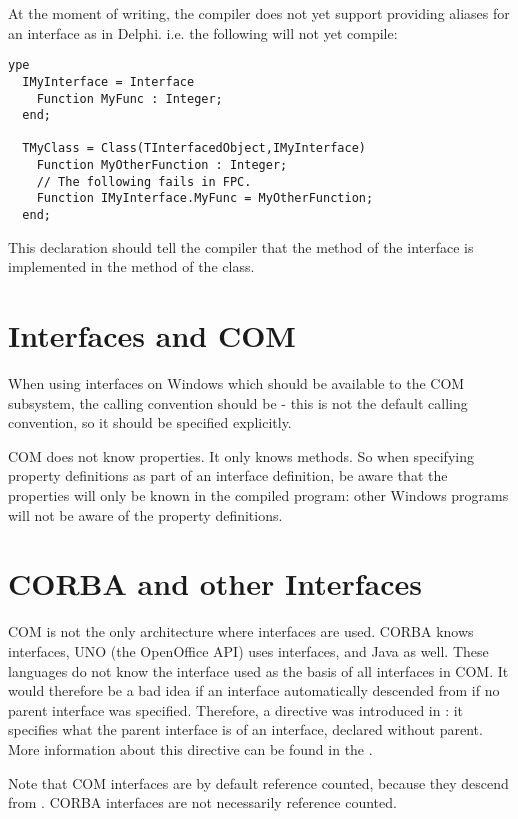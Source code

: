 At the moment of writing, the compiler does not yet support providing
aliases for an interface as in Delphi. i.e. the following will not yet 
compile:
\begin{verbatim}
ype
  IMyInterface = Interface
    Function MyFunc : Integer;
  end;

  TMyClass = Class(TInterfacedObject,IMyInterface)
    Function MyOtherFunction : Integer;
    // The following fails in FPC.
    Function IMyInterface.MyFunc = MyOtherFunction;
  end;
\end{verbatim}
This declaration should tell the compiler that the  method of
the  interface is implemented in the 
method of the  class.

\section{Interfaces and COM}
When using interfaces on Windows which should be available to the COM
subsystem, the calling convention should be  - this is not the
default \fpc calling convention, so it should be specified explicitly.

COM does not know properties. It only knows methods. So when specifying
property definitions as part of an interface definition, be aware that the
properties will only be known in the \fpc compiled program: other Windows
programs will not be aware of the property definitions. 

\section{CORBA and other Interfaces}
COM is not the only architecture where interfaces are used. CORBA knows
interfaces, UNO (the OpenOffice API) uses interfaces, and Java as well.
These languages do not know the  interface used as the basis of
all interfaces in COM. It would therefore be a bad idea if an interface
automatically descended from  if no parent interface was
specified. Therefore, a directive  was introduced in
 \fpc: it specifies what the parent interface is of an interface, declared
without parent. More information about this directive can be found in the
\progref.

Note that COM interfaces are by default reference counted, because they 
descend from .
CORBA interfaces are not necessarily reference counted.

